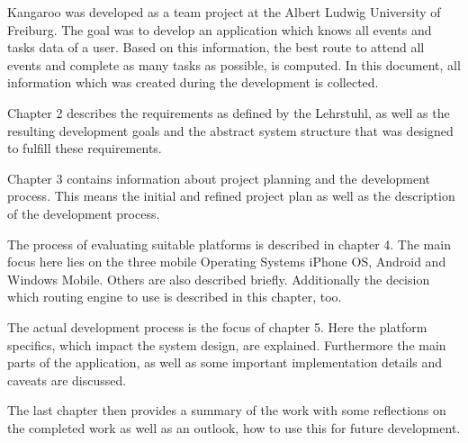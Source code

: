 Kangaroo was developed as a team project at the Albert Ludwig University of
Freiburg. The goal was to develop an application which knows all events and
tasks data of a user. Based on this information, the best route to attend all
events and complete as many tasks as possible, is computed. In this document,
all information which was created during the development is collected.

Chapter 2 describes the requirements as defined by the Lehrstuhl, as well as the
resulting development goals and the abstract system structure that was designed
to fulfill these requirements.

Chapter 3 contains information about project planning and the development
process. This means the initial and refined project plan as well as the
description of the development process.

The process of evaluating suitable platforms is described in chapter 4. The main
focus here lies on the three mobile Operating Systems iPhone OS, Android and
Windows Mobile. Others are also described briefly. Additionally the decision
which routing engine to use is described in this chapter, too.

The actual development process is the focus of chapter 5. Here the platform
specifics, which impact the system design, are explained. Furthermore the main
parts of the application, as well as some important implementation details and
caveats are discussed.

The last chapter then provides a summary of the work with some reflections on
the completed work as well as an outlook, how to use this for future
development.
